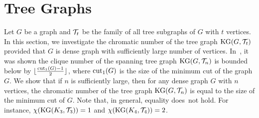 \documentclass[11pt]{article}
\begin{document}
\section{Tree Graphs}\label{resultsec}
Let $G$ be a graph and ${\cal T}_t$ be the family of all tree subgraphs of $G$ with $t$ vertices.
In this section, we investigate the chromatic number of the tree graph ${\rm KG}(G,{\cal T}_t)$ provided that $G$ is dense graph with sufficiently large number of vertices. In~\cite{MR0369117}, it was shown  
the clique number of the spanning tree graph ${\rm KG}(G,{\cal T}_n)$ is bounded below by $\lfloor{{\rm cut}_1(G)-1\over 2}\rfloor$, 
where ${\rm cut}_1(G)$ is the size of the minimum cut of the graph $G$. We show that if 
$n$ is sufficiently large, then for any dense graph $G$ with $n$ vertices, 
the chromatic number of the tree graph ${\rm KG}(G,{\cal T}_n)$ is equal to the size of the minimum cut of $G$. Note that, in general, equality does~not hold. For instance, $\chi({\rm KG}(K_3,{\cal T}_3))=1$ and $\chi({\rm KG}(K_4,{\cal T}_4))=2$. 
\end{document}

